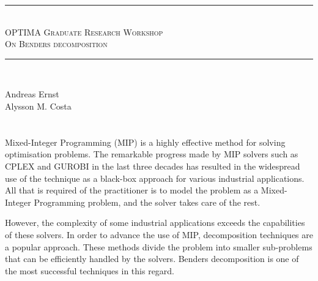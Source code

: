 
\usepackage{pgfplots}
\pgfplotsset{compat=1.16}
\usepackage{booktabs}








\begin{titlepage}

\begin{center}

\vfill

\rule{\linewidth}{0.5mm} \\[0.4cm]
\textsc{\Large OPTIMA Graduate Research Workshop \\[0.4cm] On  Benders decomposition }
\rule{\linewidth}{0.5mm} \\[1.5cm]

\end{center}

{\large 
\noindent Andreas Ernst\\[.3cm]
\noindent Alysson M. Costa\\
}

\vfill 


\end{titlepage}


\section*{}

\vfill

Mixed-Integer Programming (MIP) is a highly effective method for solving optimisation problems. The remarkable progress made by MIP solvers such as CPLEX and GUROBI in the last three decades has resulted in the widespread use of the technique as a black-box approach for various industrial applications. All that is required of the practitioner is to model the problem as a Mixed-Integer Programming problem, and the solver takes care of the rest.

However, the complexity of some industrial applications exceeds the capabilities of these solvers. In order to advance the use of MIP, decomposition techniques are a popular approach. These methods divide the problem into smaller sub-problems that can be efficiently handled by the solvers. Benders decomposition is one of the most successful techniques in this regard.

